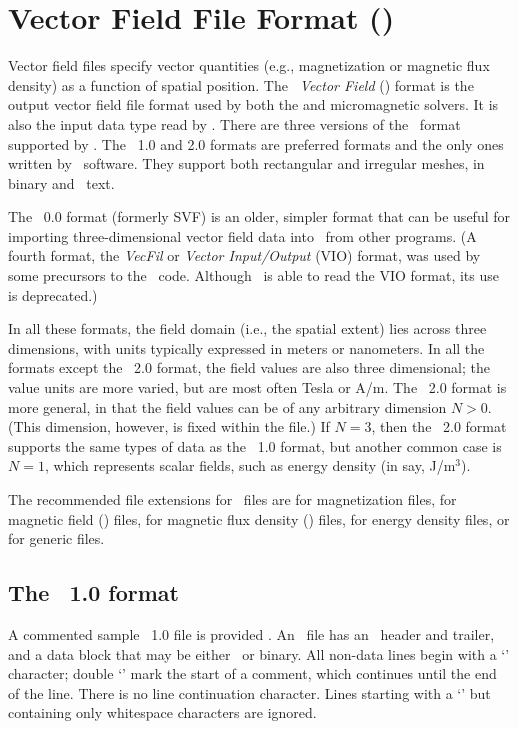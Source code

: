 \section{Vector Field File Format (\OVF)}\label{sec:vfformats}
Vector field files specify vector quantities
(e.g., magnetization or magnetic flux density) as a function of spatial
position.  The \textit{\OOMMF\ Vector Field} (\OVF) format is the output
vector field file format used by both the
 and
micromagnetic solvers.  It is also the input data type read by
.  There
are three versions of the \OVF\ format supported by \OOMMF.  The
\OVF~1.0 and 2.0 formats are preferred formats and the only ones
written by \OOMMF\ software.  They support both rectangular and
irregular meshes, in binary and \ASCII\ text.

The \OVF~0.0 format (formerly SVF)
is an older, simpler format that can be useful for importing
three-dimensional vector
field data into \OOMMF\ from other programs.  (A fourth format, the
\textit{VecFil} or \textit{Vector Input/Output}
(VIO) format, was used by some precursors to the \OOMMF\
code.  Although \OOMMF\ is able to read the VIO format, its use is
deprecated.)

In all these formats, the field domain (i.e., the spatial extent) lies
across three dimensions, with units typically expressed in meters or
nanometers.  In all the formats except the \OVF~2.0 format, the field
values are also three dimensional; the value units are more varied, but
are most often Tesla or A/m.  The \OVF~2.0 format is more general, in
that the field values can be of any arbitrary dimension $N>0$.  (This
dimension, however, is fixed within the file.)  If $N=3$, then the
\OVF~2.0 format supports the same types of data as the \OVF~1.0
format, but another common case is $N=1$, which represents scalar
fields, such as energy density (in say, J/m${}^3$).

The recommended file extensions for \OVF\ files are  for
magnetization files, \fn{.ohf} for magnetic field (\vH) files,  
for magnetic flux density (\vB) files,  \fn{.oef} for energy density
files, or \fn{.ovf} for generic files.  

\subsection{The \OVF\ 1.0 format}\label{sec:ovfformat}
A commented sample \OVF\ 1.0 file is provided
.
An \OVF\ file has an \ASCII\ header and trailer, and a data block that
may be either \ASCII\ or binary.  All non-data lines begin with a `\lb'
character; double `\lb\lb' mark the start of a comment, which
continues until the end of the line.  There is no line continuation
character.  Lines starting with a `\lb' but containing only whitespace
characters are ignored.

